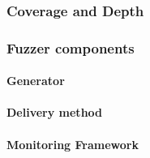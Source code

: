 \subsubsection{Coverage and Depth}

\subsubsection{Fuzzer components}

\paragraph{Generator}

\paragraph{Delivery method}

\paragraph{Monitoring Framework}
